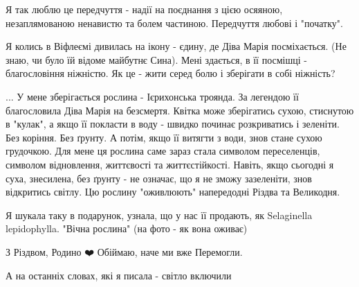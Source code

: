 Я так люблю це передчуття - надії на поєднання з цією осяяною, незаплямованою
ненавистю та болем частиною. Передчуття любові і "початку".

Я колись в Віфлеємі дивилась на ікону - єдину, де Діва Марія посміхається. (Не
знаю, чи було їй відоме майбутнє Сина). Мені здається, в її посмішці -
благословіння ніжністю. Як це - жити серед болю і зберігати в собі ніжність?

... У мене зберігається рослина - Ієрихонська троянда. За легендою її
благословила Діва Марія на безсмертя. Квітка може зберігатись сухою, стиснутою
в "кулак", а якщо її покласти в воду - швидко починає розкриватись і зеленіти.
Без коріння. Без ґрунту. А потім, якщо її витягти з води, знов стане сухою
грудочкою. Для мене ця рослина саме зараз стала символом переселенців, символом
відновлення, життєвості та життєстійкості. Навіть, якщо сьогодні я суха,
знесилена, без ґрунту - не означає, що я не зможу зазеленіти, знов відкритись
світлу. Цю рослину "оживлюють" напередодні Різдва та Великодня.

Я шукала таку в подарунок, узнала, що у нас її продають, як Selaginella
lepidophylla. "Вічна рослина" (на фото - як вона оживає)

З Різдвом, Родино ❤️ Обіймаю, наче ми вже Перемогли.

А на останніх словах, які я писала - світло включили
